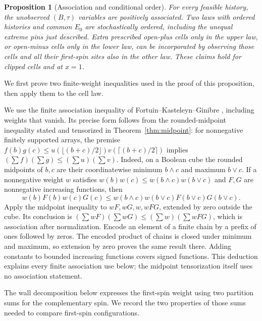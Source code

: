 \documentclass[11pt]{article}
\newtheorem{proposition}[theorem]{Proposition}
\theoremstyle{definition}
\theoremstyle{remark}
\numberwithin{equation}{section}
\begin{document}
\begin{proposition}[Association and conditional order]\label{prop:history-order}
For every feasible history, the unobserved $(B,\tau)$ variables are
positively associated. Two laws with ordered histories and common $E_0$
are stochastically ordered, including the unequal extreme pins just
described. Extra prescribed open-plus cells only in the upper law, or
open-minus cells only in the lower law, can be incorporated by observing
those cells and all their first-spin sites also in the other law. These
claims hold for clipped cells and at $x=1$.
\end{proposition}

We first prove two finite-weight inequalities used in the proof of this
proposition, then apply them to the cell law.

We use the finite association inequality of Fortuin--Kasteleyn--Ginibre
\cite{FKG1971}, including weights that vanish.  Its precise form follows
from the rounded-midpoint inequality stated and tensorized in
Theorem~\ref{thm:midpoint}: for nonnegative finitely supported arrays,
the premise
$f(b)g(c)\le u(\lfloor(b+c)/2\rfloor)v(\lceil(b+c)/2\rceil)$
implies $(\sum f)(\sum g)\le(\sum u)(\sum v)$.
Indeed, on a Boolean cube the rounded
midpoints of $b,c$ are their coordinatewise minimum $b\wedge c$ and
maximum $b\vee c$.  If a nonnegative weight $w$ satisfies
$w(b)w(c)\le w(b\wedge c)w(b\vee c)$ and $F,G$ are nonnegative
increasing functions, then
\[
 w(b)F(b)w(c)G(c)
 \le w(b\wedge c)w(b\vee c)F(b\vee c)G(b\vee c).
\]
Apply the midpoint inequality to $wF,wG,w,wFG$, extended by zero
outside the cube.  Its conclusion is
$(\sum wF)(\sum wG)\le(\sum w)(\sum wFG)$, which is association
after normalization.  Encode an element of a finite chain by a prefix
of ones followed by zeros.  The encoded product of chains is closed
under minimum and maximum, so extension by zero proves the same result
there.  Adding constants to bounded increasing functions covers signed
functions.  This deduction explains every finite association use below;
the midpoint tensorization itself uses no association statement.

The wall decomposition below expresses the first-spin weight using two
partition sums for the complementary spin.  We record the two properties
of those sums needed to compare first-spin configurations.
\end{document}
